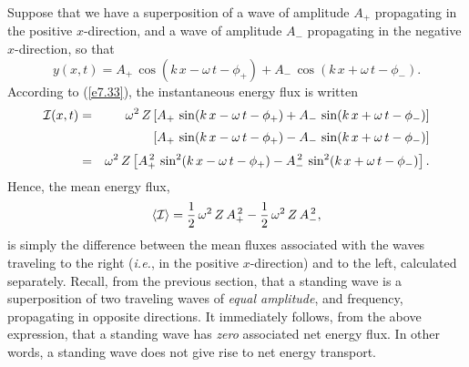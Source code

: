 Suppose that we have a superposition of a wave of amplitude $A_+$ propagating in the
positive $x$-direction, and a wave of amplitude $A_-$ propagating
in the negative $x$-direction, so that
\begin{equation}
y(x,t) = A_+\,\cos(k\,x-\omega\,t-\phi_+) + A_-\,\cos(k\,x+\omega\,t-\phi_-).
\end{equation}
According to (\ref{e7.33}), the instantaneous energy flux is written
\begin{eqnarray}
{\cal I}(x,t)&=& \omega^2\,Z\left[A_+\,\sin(k\,x-\omega\,t-\phi_+)+A_-\,\sin(k\,x+\omega\,t-\phi_-)\right]\nonumber\\[0.5ex] &&\left[A_+\,\sin(k\,x-\omega\,t-\phi_+)-A_-\,\sin(k\,x+\omega\,t-\phi_-)\right]\nonumber\\[0.5ex]
&=& \omega^2\,Z\left[A_+^{\,2}\,\sin^2(k\,x-\omega\,t-\phi_+) - A_-^{\,2}\,\sin^2(k\,x+\omega\,t-\phi_-)\right].
\end{eqnarray}
Hence, the mean energy flux,
\begin{equation}
\langle {\cal I}\rangle = \frac{1}{2}\,\omega^2\,Z\,A_+^{\,2} - \frac{1}{2}\,\omega^2\,Z\,A_-^{\,2},
\end{equation}
is simply the difference between the mean fluxes associated with the waves traveling
to the right ({\em i.e.}, in the positive $x$-direction) and to the left, calculated  separately. Recall, from the previous section, that a standing wave
is a superposition of two traveling waves of {\em equal amplitude}, and frequency,
propagating in opposite directions. It immediately follows, from the above expression,
that a standing wave has {\em zero}\/ associated net energy flux. In other words,
a standing wave does not give rise to net energy transport.

